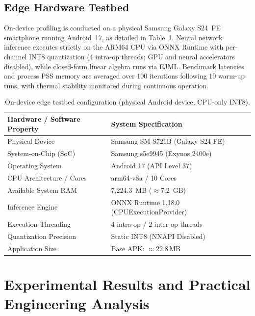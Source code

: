 \documentclass[preprint,12pt]{elsarticle}
\begin{document}
\subsection{Edge Hardware Testbed}
\label{sec:edge_hardware_testbed}
On-device profiling is conducted on a physical Samsung Galaxy S24~FE smartphone running Android~17, as detailed in Table~\ref{tab:device_spec}. Neural network inference executes strictly on the ARM64 CPU via ONNX Runtime with per-channel INT8 quantization (4 intra-op threads; GPU and neural accelerators disabled), while closed-form linear algebra runs via EJML. Benchmark latencies and process PSS memory are averaged over 100 iterations following 10 warm-up runs, with thermal stability monitored during continuous operation.

\begin{table}[htbp]
\caption{On-device edge testbed configuration (physical Android device, CPU-only INT8).}
\label{tab:device_spec}
\centering
\footnotesize
\begin{tabular}{ll}
\toprule
\textbf{Hardware / Software Property} & \textbf{System Specification} \\
\midrule
Physical Device & Samsung SM-S721B (Galaxy S24 FE) \\
System-on-Chip (SoC) & Samsung s5e9945 (Exynos 2400e) \\
Operating System & Android 17 (API Level 37) \\
CPU Architecture / Cores & arm64-v8a / 10 Cores \\
Available System RAM & 7,224.3~MB ($\approx$7.2~GB) \\
Inference Engine & ONNX Runtime 1.18.0 (CPUExecutionProvider) \\
Execution Threading & 4 intra-op / 2 inter-op threads \\
Quantization Precision & Static INT8 (NNAPI Disabled) \\
Application Size & Base APK: $\approx$22.8\,MB \\
\bottomrule
\end{tabular}
\end{table}
\section{Experimental Results and Practical Engineering Analysis}
\label{sec:results}
\end{document}
